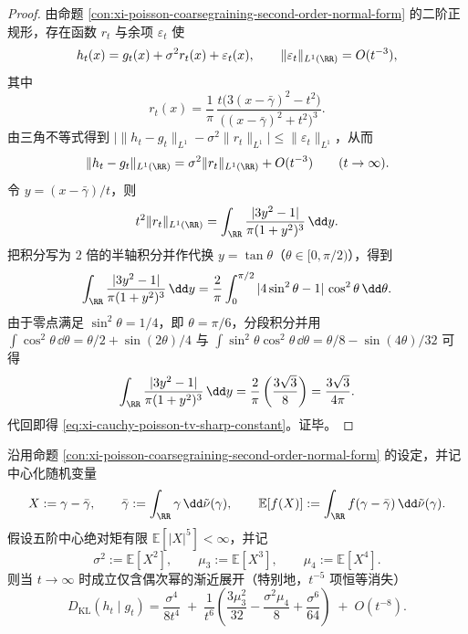 \begin{proof}
由命题 \ref{con:xi-poisson-coarsegraining-second-order-normal-form} 的二阶正规形，存在函数 \(r_t\) 与余项 \(\varepsilon_t\) 使
\[
h_t(x)=g_t(x)+\sigma^2 r_t(x)+\varepsilon_t(x),
\qquad
\|\varepsilon_t\|_{L^1(\RR)}=O(t^{-3}),
\]
其中
\[
r_t(x)=\frac{1}{\pi}\,
\frac{t\bigl(3(x-\bar\gamma)^2-t^2\bigr)}{\bigl((x-\bar\gamma)^2+t^2\bigr)^3}.
\]
由三角不等式得到
\(
\bigl|\|h_t-g_t\|_{L^1}-\sigma^2\|r_t\|_{L^1}\bigr|
\le \|\varepsilon_t\|_{L^1}
\)，从而
\[
\|h_t-g_t\|_{L^1(\RR)}
=\sigma^2\|r_t\|_{L^1(\RR)}+O(t^{-3})
\qquad(t\to\infty).
\]
令 \(y=(x-\bar\gamma)/t\)，则
\[
t^2\|r_t\|_{L^1(\RR)}
=\int_{\RR}\frac{|3y^2-1|}{\pi(1+y^2)^3}\,\dd y.
\]
把积分写为 \(2\) 倍的半轴积分并作代换 \(y=\tan\theta\)（\(\theta\in[0,\pi/2)\)），得到
\[
\int_{\RR}\frac{|3y^2-1|}{\pi(1+y^2)^3}\,\dd y
=\frac{2}{\pi}\int_{0}^{\pi/2}|4\sin^2\theta-1|\,\cos^2\theta\,\dd\theta.
\]
由于零点满足 \(\sin^2\theta=1/4\)，即 \(\theta=\pi/6\)，分段积分并用
\(
\int \cos^2\theta\,\dd\theta=\theta/2+\sin(2\theta)/4
\) 与
\(
\int \sin^2\theta\cos^2\theta\,\dd\theta=\theta/8-\sin(4\theta)/32
\)
可得
\[
\int_{\RR}\frac{|3y^2-1|}{\pi(1+y^2)^3}\,\dd y
=\frac{2}{\pi}\left(\frac{3\sqrt3}{8}\right)=\frac{3\sqrt3}{4\pi}.
\]
代回即得 \eqref{eq:xi-cauchy-poisson-tv-sharp-constant}。证毕。
\end{proof}

\begin{theorem}\label{thm:xi-cauchy-poisson-kl-sharp-asymptotics}
沿用命题 \ref{con:xi-poisson-coarsegraining-second-order-normal-form} 的设定，并记中心化随机变量
\[
X:=\gamma-\bar\gamma,
\qquad
\bar\gamma:=\int_{\RR}\gamma\,\dd\tilde\nu(\gamma),
\qquad
\mathbb{E}[f(X)]:=\int_{\RR}f(\gamma-\bar\gamma)\,\dd\tilde\nu(\gamma).
\]
假设五阶中心绝对矩有限 \(\mathbb{E}[|X|^5]<\infty\)，并记
\[
\sigma^2:=\mathbb{E}[X^2],\qquad
\mu_3:=\mathbb{E}[X^3],\qquad
\mu_4:=\mathbb{E}[X^4].
\]
则当 \(t\to\infty\) 时成立仅含偶次幂的渐近展开（特别地，\(t^{-5}\) 项恒等消失）
\begin{equation}\label{eq:xi-cauchy-poisson-kl-sharp-asymptotics}
\boxed{\;
D_{\mathrm{KL}}(h_t\mid g_t)
=\frac{\sigma^4}{8t^4}
\;+\;\frac{1}{t^6}\left(
\frac{3\mu_3^2}{32}
-\frac{\sigma^2\mu_4}{8}
+\frac{\sigma^6}{64}
\right)
\;+\;O(t^{-8}).\;}
\end{equation}
\end{theorem}

